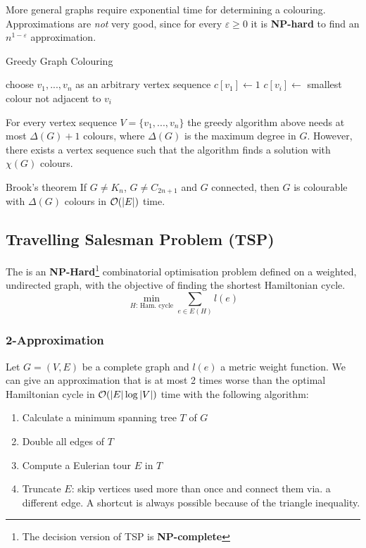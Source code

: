 \documentclass[a3paper, landscape, 11pt]{article} %
\begin{document}
\begin{multicols*}{4}
More general graphs require exponential time for determining a colouring. Approximations are \textit{not} very good, since for every $\varepsilon \ge 0$ it is \textbf{NP-hard} to find an $n^{1-\varepsilon}$ approximation.\\

\begin{algorithm}[H]
\caption{Greedy Graph Colouring}
\begin{algorithmic}[1]
\State choose $v_1,...,v_n$ as an arbitrary vertex sequence
\State $c[v_1] \gets 1$
	\State $c[v_i] \gets$ smallest colour not adjacent to $v_i$
\EndFor
\EndProcedure
\end{algorithmic}
\end{algorithm}
For every vertex sequence $V=\{v_1,...,v_n\}$ the greedy algorithm above needs at most $\Delta(G)+1$ colours, where $\Delta(G)$ is the maximum degree in $G$. However, there exists a vertex sequence such that the algorithm finds a solution with $\chi(G)$ colours.\\
\begin{mainbox}{Brook's theorem}
If $G\ne K_n$, $G \ne C_{2n+1}$ and $G$ connected, then $G$ is colourable with $\Delta(G)$ colours in $\mathcal{O}(|E|)$ time.
\end{mainbox}

\vfill %

\subsection*{Travelling Salesman Problem (TSP)}
The   is an \textbf{NP-Hard}\footnote{The decision version of TSP is \textbf{NP-complete}} combinatorial optimisation problem defined on a weighted, undirected graph, with the objective of finding the shortest Hamiltonian cycle.
$$
\min_{\text{$H$: Ham. cycle}} \sum_{e\in E(H)} l(e)
$$


\subsubsection*{2-Approximation}
Let $G=(V,E)$ be a complete graph and $l(e)$ a metric weight function. We can give an approximation that is at most 2 times worse than the optimal Hamiltonian cycle in $\mathcal{O}(|E| \operatorname{log}|V|)$ time with the following algorithm:

\begin{enumerate}[noitemsep]
	\item Calculate a minimum spanning tree $T$ of $G$
	\item Double all edges of $T$
	\item Compute a Eulerian tour $E$ in $T$
	\item Truncate $E$: skip vertices used more than once and connect them via. a different edge. A shortcut is always possible because of the triangle inequality.
\end{enumerate}


\end{multicols*}
\end{document}
